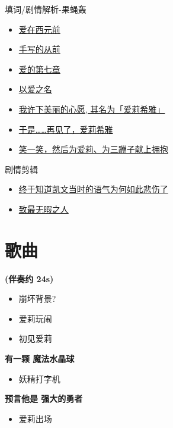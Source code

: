 \documentclass[a4paper]{article}
\begin{document}
填词/剧情解析-果蝇轰

\begin{itemize}
    \item \href{https://www.bilibili.com/video/BV1qN411g71m/}{爱在西元前}
    \item \href{https://www.bilibili.com/video/BV1PV4y1x7CD/}{手写的从前}
    \item \href{https://www.bilibili.com/video/BV1dr4y177gy/}{爱的第七章}
    \item \href{https://www.bilibili.com/video/BV1Yr4y1q7Pt/}{以爱之名}
    \item \href{https://www.bilibili.com/video/BV1BF411w7fD/}{我许下美丽的心愿, 其名为「爱莉希雅」}
    \item \href{https://www.bilibili.com/video/BV1Cr4y1573W/}{于是……再见了，爱莉希雅}
    \item \href{https://www.bilibili.com/video/BV1WN4y1L745/}{笑一笑，然后为爱莉、为三蹦子献上拥抱}
\end{itemize}

剧情剪辑

\begin{itemize}
    \item \href{https://www.bilibili.com/video/BV1Ta411S71B/}{终于知道凯文当时的语气为何如此悲伤了}
    \item \href{https://www.bilibili.com/video/BV16d4y137k6/}{致最无暇之人}
\end{itemize}

\section{歌曲}

\textbf{(伴奏约 24s)}

\begin{itemize}
    \item 崩坏背景?
    \item 爱莉玩闹
    \item 初见爱莉
\end{itemize}

\textbf{有一颗 魔法水晶球}

\begin{itemize}
    \item 妖精打字机
\end{itemize}

\textbf{预言他是 强大的勇者}

\begin{itemize}
    \item 爱莉出场
\end{itemize}
\end{document}
